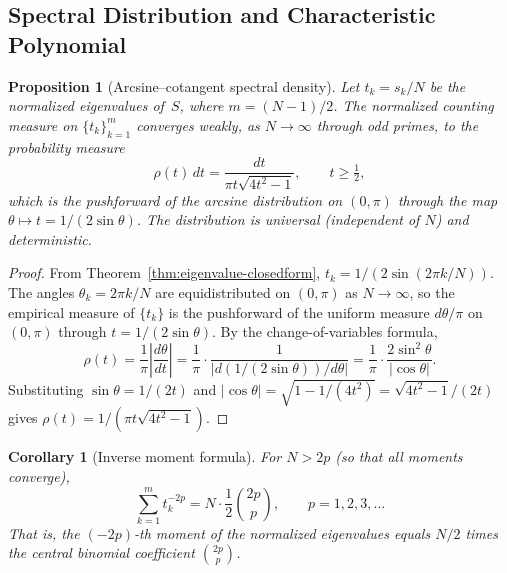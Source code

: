 \documentclass[aip,jmp,reprint,superscriptaddress,floatfix,nofootinbib]{revtex4-2}
\newtheorem{corollary}[theorem]{Corollary}
\newtheorem{proposition}[theorem]{Proposition}
\theoremstyle{definition}
\theoremstyle{remark}
\begin{document}
\subsection{Spectral Distribution and Characteristic Polynomial}
\label{sec:spectral-distribution}

\begin{proposition}[Arcsine--cotangent spectral density]
\label{prop:spectral-density}
Let $t_k = s_k/N$ be the normalized eigenvalues of~$S$,
where $m = (N{-}1)/2$.
The normalized counting measure on $\{t_k\}_{k=1}^{m}$ converges
weakly, as $N\to\infty$ through odd primes, to the probability measure
\begin{equation}\label{eq:spectral-density}
  \rho(t)\,dt = \frac{dt}{\pi t\sqrt{4t^2-1}}, \qquad t \ge \tfrac{1}{2},
\end{equation}
which is the pushforward of the arcsine distribution on $(0,\pi)$ through
the map $\theta \mapsto t = 1/(2\sin\theta)$.
The distribution is universal (independent of $N$) and deterministic.
\end{proposition}

\begin{proof}
From Theorem~\ref{thm:eigenvalue-closedform}, $t_k = 1/(2\sin(2\pi k/N))$.
The angles $\theta_k = 2\pi k/N$ are equidistributed on $(0,\pi)$
as $N\to\infty$, so the empirical measure of $\{t_k\}$ is the pushforward
of the uniform measure $d\theta/\pi$ on $(0,\pi)$ through $t = 1/(2\sin\theta)$.
By the change-of-variables formula,
\[
  \rho(t) = \frac{1}{\pi}\left|\frac{d\theta}{dt}\right|
  = \frac{1}{\pi}\cdot\frac{1}{|d(1/(2\sin\theta))/d\theta|}
  = \frac{1}{\pi}\cdot\frac{2\sin^2\!\theta}{|\cos\theta|}.
\]
Substituting $\sin\theta = 1/(2t)$ and
$|\cos\theta| = \sqrt{1-1/(4t^2)} = \sqrt{4t^2-1}/(2t)$
gives $\rho(t) = 1/(\pi t\sqrt{4t^2-1})$.
\end{proof}

\begin{corollary}[Inverse moment formula]
\label{cor:inverse-moments}
For $N > 2p$ (so that all moments converge),
\begin{equation}\label{eq:inverse-moments}
  \sum_{k=1}^{m} t_k^{-2p}
  = N\cdot\frac{1}{2}\binom{2p}{p}, \qquad p = 1,2,3,\ldots
\end{equation}
That is, the $(-2p)$-th moment of the normalized eigenvalues equals
$N/2$ times the central binomial coefficient $\binom{2p}{p}$.
\end{corollary}
\end{document}

